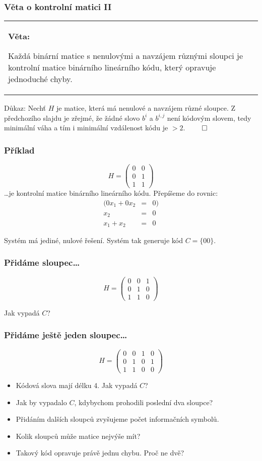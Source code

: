 \documentclass{beamer}
\newenvironment{veta}
{
    \begin{center}
    \begin{tabular}{p{9cm}}
    \textbf{Věta:}
}
{
    \end{tabular}
    \end{center}
}
\newenvironment{itemizey}%
  {\large \begin{itemize}%
    \setlength{\itemsep}{6pt}%
    \setlength{\parskip}{6pt}}%
  {\end{itemize}}
\begin{document}
\begin{frame}[t,fragile]\frametitle{Věta o kontrolní matici II} 
    \begin{veta}
    Každá binární matice s nenulovými a navzájem různými sloupci je kontrolní matice binárního lineárního kódu, který opravuje jednoduché chyby.
    \end{veta}

    Důkaz: Nechť $H$ je matice, která má nenulové a navzájem různé sloupce. Z předchozího slajdu je zřejmé, že žádné slovo $b^i$ a $b^{i, j}$ není kódovým slovem, tedy minimální váha a tím i minimální vzdálenost kódu je $>2$. $\qed$
\end{frame}



\begin{frame}[t,fragile]\frametitle{Příklad} 
$$
H=\begin{pmatrix}
0&0\\
0&1\\
1&1
\end{pmatrix}
$$
\dots je kontrolní matice binárního lineárního kódu. Přepíšeme do rovnic:
\begin{eqnarray*}
(0x_1+0x_2&=&0)\\
x_2&=&0\\
x_1+x_2&=&0
\end{eqnarray*}

Systém má jediné, nulové řešení. Systém tak generuje kód $C=\{00\}$.
\end{frame}


\begin{frame}[t,fragile]\frametitle{Přidáme sloupec\dots} 
$$
H=\begin{pmatrix}
0&0&1\\
0&1&0\\
1&1&0
\end{pmatrix}
$$

Jak vypadá $C$?
\end{frame}


\begin{frame}[t,fragile]\frametitle{Přidáme ještě jeden sloupec\dots} 
$$
H=\begin{pmatrix}
0&0&1&0\\
0&1&0&1\\
1&1&0&0
\end{pmatrix}
$$

\begin{itemizey}
    \item Kódová slova mají délku 4. Jak vypadá $C$? 
    \item Jak by vypadalo $C$, kdybychom prohodili poslední dva sloupce?
    \item Přidáním dalších sloupců zvyšujeme počet informačních symbolů.
    \item Kolik sloupců může matice nejvýše mít?
    \item Takový kód opravuje právě jednu chybu. Proč ne dvě?
\end{itemizey}
\end{frame}
\end{document}
